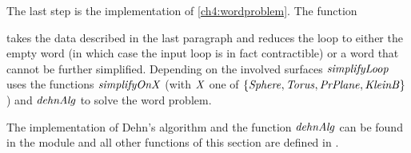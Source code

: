 The last step is the implementation of \cref{ch4:wordproblem}. The function\begin{hscode}\SaveRestoreHook
{}%
%
%
\>[3]{}\mathbin{::}\;\to {}\to {}\<[E]%
\ColumnHook
\end{hscode}\resethooks
takes the data described in the last paragraph and reduces the loop to either
the empty word (in which case the input loop is in fact contractible) or a
word that cannot be further simplified. Depending on the involved surfaces
\ensuremath{\Varid{simplifyLoop}} uses the functions \ensuremath{\Varid{simplifyOnX}} (with \ensuremath{\Conid{X}} one of
$\{\text{\ensuremath{\mathit{Sphere}}}, \text{\ensuremath{\mathit{Torus}}}, \text{\ensuremath{\mathit{PrPlane}}}, \text{\ensuremath{\mathit{KleinB}}}\}$)
and \ensuremath{\Varid{dehnAlg}} to solve the word problem.

The implementation of Dehn's algorithm and the function \ensuremath{\Varid{dehnAlg}} can be found
in the module  and all other functions of this section are
defined in .
